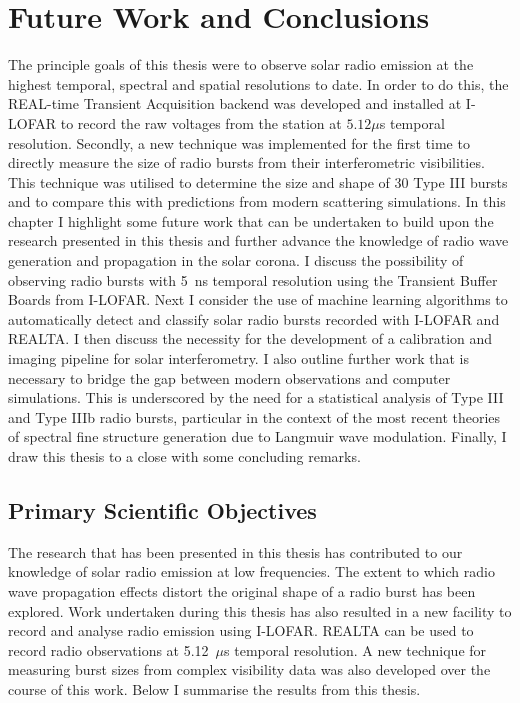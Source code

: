 \doublespacing
\chapter{Future Work and Conclusions}
\label{chap:future}
The principle goals of this thesis were to observe solar radio emission at the highest temporal, spectral and spatial resolutions to date. In order to do this, the REAL-time Transient Acquisition backend was developed and installed at I-LOFAR to record the raw voltages from the station at $5.12 \mu$s temporal resolution.
Secondly, a new technique was implemented for the first time to directly measure the size of radio bursts from their interferometric visibilities. This technique was utilised to determine the size and shape of 30 Type III bursts and to compare this with predictions from modern scattering simulations.
In this chapter I highlight some future work that can be undertaken to build upon the research presented in this thesis and further advance the knowledge of radio wave generation and propagation in the solar corona. I discuss the possibility of observing radio bursts with 5~ns temporal resolution using the Transient Buffer Boards from I-LOFAR. Next I consider the use of machine learning algorithms to automatically detect and classify solar radio bursts recorded with I-LOFAR and REALTA. I then discuss the necessity for the development of a calibration and imaging pipeline for solar interferometry. I also outline further work that is necessary to bridge the gap between modern observations and computer simulations. This is underscored by the need for a statistical analysis of Type III and Type IIIb radio bursts, particular in the context of the most recent theories of spectral fine structure generation due to Langmuir wave modulation. Finally, I draw this thesis to a close with some concluding remarks.

\section{Primary Scientific Objectives}
The research that has been presented in this thesis has contributed to our knowledge of solar radio emission at low frequencies. The extent to which radio wave propagation effects distort the original shape of a radio burst has been explored. Work undertaken during this thesis has also resulted in a new facility to record and analyse radio emission using I-LOFAR. REALTA can be used to record radio observations at 5.12~$\mu$s temporal resolution. A new technique for measuring burst sizes from complex visibility data was also developed over the course of this work. Below I summarise the results from this thesis. 


